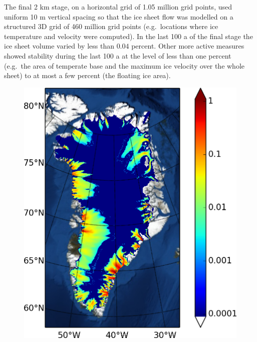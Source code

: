 \documentclass[gmd]{copernicus}   %
\begin{document}
The final 2 km stage, on a horizontal grid of 1.05 million grid points, used uniform 10 m vertical spacing so that the ice sheet flow was modelled on a structured 3D grid of 460 million grid points (e.g.~locations where ice temperature and velocity were computed).  In the last 100 a of the final stage the ice sheet volume varied by less than $0.04$ percent.  Other more active measures showed stability during the last 100 a at the level of less than one percent (e.g.~the area of temperate base and the maximum ice velocity over the whole sheet) to at most a few percent (the floating ice area).

\begin{figure}[ht]
\mbox{\includegraphics[height=\grnht,keepaspectratio=true]{g2km-init-bmelt} \,
}
\end{figure}
\end{document}
